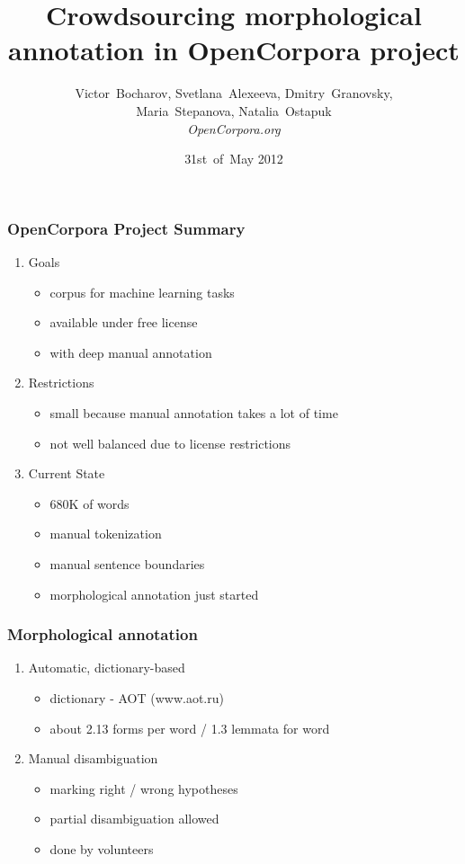 \documentclass{beamer}
\title{Crowdsourcing morphological annotation in OpenCorpora project}
\author{Victor~Bocharov, Svetlana~Alexeeva, Dmitry~Granovsky,\\Maria~Stepanova, Natalia~Ostapuk\\\small\it OpenCorpora.org}
\date{31st~of~May 2012}
\begin{document}
\maketitle

\begin{frame}
\frametitle{OpenCorpora Project Summary}
\begin{enumerate}
\item{Goals}
    \begin{itemize}
    \item{corpus for machine learning tasks}
    \item{available under free license}
    \item{with deep manual annotation}
    \end{itemize}
    \pause
\item{Restrictions}
    \begin{itemize}
    \item{small because manual annotation takes a lot of time}
    \item{not well balanced due to license restrictions}
    \end{itemize}
    \pause
\item{Current State}
    \begin{itemize}
    \item{680K of words}
    \item{manual tokenization}
    \item{manual sentence boundaries}
    \item{morphological annotation just started}
    \end{itemize}
\end{enumerate}
\end{frame}

\begin{frame}
\frametitle{Morphological annotation}
\begin{enumerate}
\item{Automatic, dictionary-based}
    \begin{itemize}
    \item{dictionary - AOT (www.aot.ru)}
    \item{about 2.13 forms per word / 1.3 lemmata for word}
    \end{itemize}
\item{Manual disambiguation}
    \begin{itemize}
    \item{marking right / wrong hypotheses}
    \item{partial disambiguation allowed}
    \item{done by volunteers}
    \end{itemize}
\end{enumerate}
\end{frame}
\end{document}
